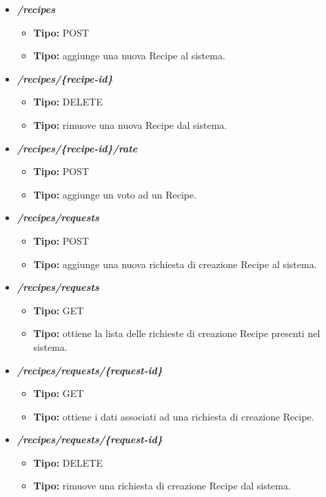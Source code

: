 \begin{itemize}
  \item \textit{\textbf{/recipes}}
  \begin{itemize}
    \item \textbf{Tipo:} POST
    \item \textbf{Tipo:} aggiunge una nuova Recipe al sistema.
  \end{itemize}
  \item \textit{\textbf{/recipes/\{recipe-id\}}}
  \begin{itemize}
    \item \textbf{Tipo:} DELETE
    \item \textbf{Tipo:} rimuove una nuova Recipe dal sistema.
  \end{itemize}
  \item \textit{\textbf{/recipes/\{recipe-id\}/rate}}
  \begin{itemize}
    \item \textbf{Tipo:} POST
    \item \textbf{Tipo:} aggiunge un voto ad un Recipe.
  \end{itemize}


  \item \textit{\textbf{/recipes/requests}}
  \begin{itemize}
    \item \textbf{Tipo:} POST
    \item \textbf{Tipo:} aggiunge una nuova richiesta di creazione Recipe al sistema.
  \end{itemize}
  \item \textit{\textbf{/recipes/requests}}
  \begin{itemize}
    \item \textbf{Tipo:} GET
    \item \textbf{Tipo:} ottiene la lista delle richieste di creazione Recipe presenti nel sistema.
  \end{itemize}
  \item \textit{\textbf{/recipes/requests/\{request-id\}}}
  \begin{itemize}
    \item \textbf{Tipo:} GET
    \item \textbf{Tipo:} ottiene i dati associati ad una richiesta di creazione Recipe.
  \end{itemize}
  \item \textit{\textbf{/recipes/requests/\{request-id\}}}
  \begin{itemize}
    \item \textbf{Tipo:} DELETE
    \item \textbf{Tipo:} rimuove una richiesta di creazione Recipe dal sistema.
  \end{itemize}

\end{itemize}
